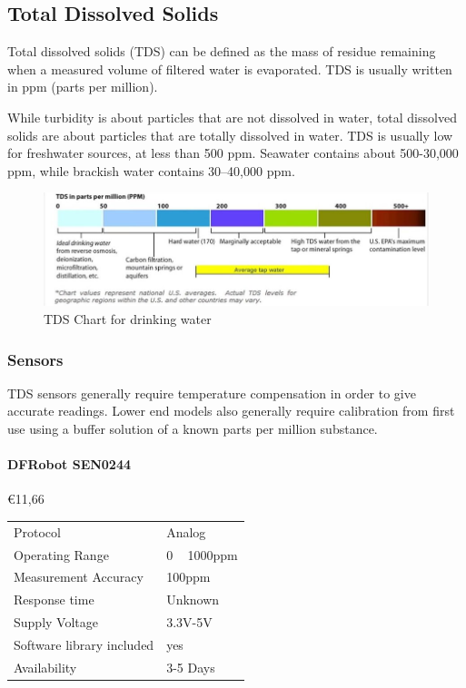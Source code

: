\newpage
\subsection{Total Dissolved Solids}
Total dissolved solids (TDS) can be defined as the mass of residue remaining when a measured volume of filtered water is evaporated. TDS is usually written in ppm (parts per million).

While turbidity is about particles that are not dissolved in water, total dissolved solids are about particles that are totally dissolved in water. TDS is usually low for freshwater sources, at less than 500 ppm. Seawater contains about 500-30,000 ppm, while brackish water contains 30–40,000 ppm.

\begin{figure}[h]
\centering
\includegraphics[scale=0.69]{water/91_tdschart.jpg}
\caption{TDS Chart for drinking water\cite{tdschart}}
\end{figure}



\subsubsection{Sensors}
TDS sensors generally require temperature compensation in order to give accurate readings. Lower end models also generally require calibration from first use using a buffer solution of a known parts per million substance. \cite{sen0244wiki}

\paragraph{DFRobot SEN0244}\mbox{€11,66} \cite{SEN0244}
\begin{table}[h!]
	\centering
	\quad
	\begin{tabular}{| l | l |}
    \hline
    Protocol & Analog\\
    Operating Range & 0 ~ 1000ppm\\
    Measurement Accuracy &  100ppm \\
    Response time & Unknown \\
    Supply Voltage & 3.3V-5V \\
    Software library included & yes \\
    Availability & 3-5 Days \\
    \hline
	\end{tabular}
\end{table}
